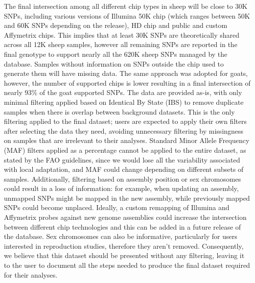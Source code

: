 \documentclass[a4paper,num-refs,gigabyte]{oup-contemporary}
\begin{document}
The final intersection among all different chip types in sheep will be close to 30K SNPs, including various versions of Illumina 50K chip (which ranges between 50K and 60K SNPs depending on the release), HD chip and public and custom Affymetrix chips. This implies that at least 30K SNPs are theoretically shared across all 12K sheep samples, however all remaining SNPs are reported in the final genotype to support nearly all the 620K sheep SNPs managed by the database. Samples without information on SNPs outside the chip used to generate them will have missing data. The same approach was adopted for goats, however, the number of supported chips is lower resulting in a final intersection of nearly 93\% of the goat supported SNPs.
The data are provided as-is, with only minimal filtering applied based on Identical By State (IBS) to remove duplicate samples when there is overlap between background datasets. This is the only filtering applied to the final dataset; users are expected to apply their own filters after selecting the data they need, avoiding unnecessary filtering by missingness on samples that are irrelevant to their analyses. Standard Minor Allele Frequency (MAF) filters applied as a percentage cannot be applied to the entire dataset, as stated by the FAO guidelines\citep{Ajmone23}, since we would lose all the variability associated with local adaptation, and MAF could change depending on different subsets of samples. Additionally, filtering based on assembly position or sex chromosomes could result in a loss of information: for example, when updating an assembly, unmapped SNPs might be mapped in the new assembly, while previously mapped SNPs could become unplaced. Ideally, a custom remapping of Illumina and Affymetrix probes against new genome assemblies could increase the intersection between different chip technologies and this can be added in a future release of the database. Sex chromosomes can also be informative, particularly for users interested in reproduction studies, therefore they aren't removed. Consequently, we believe that this dataset should be presented without any filtering, leaving it to the user to document all the steps needed to produce the final dataset required for their analyses.
\end{document}
